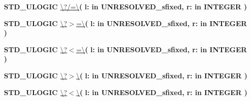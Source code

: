 \begin{DoxyCompactItemize}
\item 
{\bfseries {\bfseries \textcolor{comment}{S\+T\+D\+\_\+\+U\+L\+O\+G\+I\+C}\textcolor{vhdlchar}{ }}} \hyperlink{class__fixed__pkg_a172a73302b09f0d298b93ecda8c5e976}{\textbackslash{}?/=\textbackslash{}}{\bfseries  ( }{\bfseries \textcolor{vhdlchar}{l\+: }\textcolor{stringliteral}{in }\textcolor{vhdlchar}{U\+N\+R\+E\+S\+O\+L\+V\+E\+D\+\_\+sfixed}}{\bfseries  , \textcolor{vhdlchar}{r\+: }\textcolor{stringliteral}{in }{\bfseries \textcolor{comment}{I\+N\+T\+E\+G\+E\+R}\textcolor{vhdlchar}{ }}}{\bfseries  )} 
\item 
{\bfseries {\bfseries \textcolor{comment}{S\+T\+D\+\_\+\+U\+L\+O\+G\+I\+C}\textcolor{vhdlchar}{ }}} \hyperlink{class__fixed__pkg_a3adee8c12e5c0bb76fc3e1a493284a27}{\textbackslash{}?$>$=\textbackslash{}}{\bfseries  ( }{\bfseries \textcolor{vhdlchar}{l\+: }\textcolor{stringliteral}{in }\textcolor{vhdlchar}{U\+N\+R\+E\+S\+O\+L\+V\+E\+D\+\_\+sfixed}}{\bfseries  , \textcolor{vhdlchar}{r\+: }\textcolor{stringliteral}{in }{\bfseries \textcolor{comment}{I\+N\+T\+E\+G\+E\+R}\textcolor{vhdlchar}{ }}}{\bfseries  )} 
\item 
{\bfseries {\bfseries \textcolor{comment}{S\+T\+D\+\_\+\+U\+L\+O\+G\+I\+C}\textcolor{vhdlchar}{ }}} \hyperlink{class__fixed__pkg_a271da29f659a2bc9480dbd29d7727913}{\textbackslash{}?$<$=\textbackslash{}}{\bfseries  ( }{\bfseries \textcolor{vhdlchar}{l\+: }\textcolor{stringliteral}{in }\textcolor{vhdlchar}{U\+N\+R\+E\+S\+O\+L\+V\+E\+D\+\_\+sfixed}}{\bfseries  , \textcolor{vhdlchar}{r\+: }\textcolor{stringliteral}{in }{\bfseries \textcolor{comment}{I\+N\+T\+E\+G\+E\+R}\textcolor{vhdlchar}{ }}}{\bfseries  )} 
\item 
{\bfseries {\bfseries \textcolor{comment}{S\+T\+D\+\_\+\+U\+L\+O\+G\+I\+C}\textcolor{vhdlchar}{ }}} \hyperlink{class__fixed__pkg_a9e6b6b8c2c14da978e6f70cb6e85e6dc}{\textbackslash{}?$>$\textbackslash{}}{\bfseries  ( }{\bfseries \textcolor{vhdlchar}{l\+: }\textcolor{stringliteral}{in }\textcolor{vhdlchar}{U\+N\+R\+E\+S\+O\+L\+V\+E\+D\+\_\+sfixed}}{\bfseries  , \textcolor{vhdlchar}{r\+: }\textcolor{stringliteral}{in }{\bfseries \textcolor{comment}{I\+N\+T\+E\+G\+E\+R}\textcolor{vhdlchar}{ }}}{\bfseries  )} 
\item 
{\bfseries {\bfseries \textcolor{comment}{S\+T\+D\+\_\+\+U\+L\+O\+G\+I\+C}\textcolor{vhdlchar}{ }}} \hyperlink{class__fixed__pkg_a7e98e66a4a282c529968f69f70dd16ad}{\textbackslash{}?$<$\textbackslash{}}{\bfseries  ( }{\bfseries \textcolor{vhdlchar}{l\+: }\textcolor{stringliteral}{in }\textcolor{vhdlchar}{U\+N\+R\+E\+S\+O\+L\+V\+E\+D\+\_\+sfixed}}{\bfseries  , \textcolor{vhdlchar}{r\+: }\textcolor{stringliteral}{in }{\bfseries \textcolor{comment}{I\+N\+T\+E\+G\+E\+R}\textcolor{vhdlchar}{ }}}{\bfseries  )} 

\end{DoxyCompactItemize}
